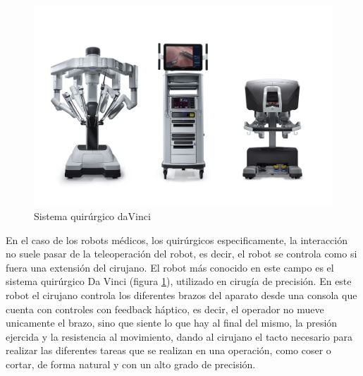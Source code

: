 \begin{figure}
	\centering
	\includegraphics[width=1\linewidth]{imagenes/davincisystem.jpg}
	\caption{Sistema quirúrgico daVinci}
	\label{fig:davincisystem}
\end{figure} 
 
 En el caso de los robots médicos, los quirúrgicos especificamente, la interacción no suele pasar de la teleoperación del robot, es decir, el robot se controla como si fuera una extensión del cirujano. El robot más conocido en este campo es el sistema quirúrgico Da Vinci (figura \ref{fig:davincisystem}), utilizado en cirugía de precisión. En este robot el cirujano controla los diferentes brazos del aparato desde una consola que cuenta con controles con feedback háptico, es decir, el operador no mueve unicamente el brazo, sino que siente lo que hay al final del mismo, la presión ejercida y la resistencia al movimiento, dando al cirujano el tacto necesario para realizar las diferentes tareas que se realizan en una operación, como coser o cortar, de forma natural y con un alto grado de precisión.
 

 
